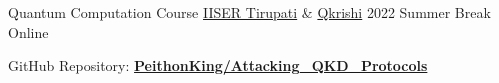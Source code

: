 



	\cvevent
	{Quantum Computation Course}
	{\href{http://www.iisertirupati.ac.in/}{IISER Tirupati} \& \href{https://qkrishi.com/}{Qkrishi}}
	{2022 Summer Break}
	{Online}

	\begin{justify}

		GitHub Repository: \href{https://github.com/PeithonKing/Attacking_QKD_Protocols}{\textbf{PeithonKing/Attacking\_QKD\_Protocols}}
	\end{justify}


        
